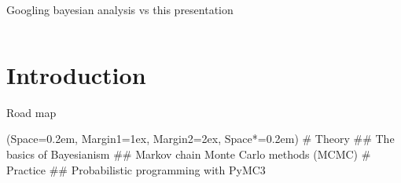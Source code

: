 \documentclass[12pt, aspectratio=149]{beamer}
\newcommand{\listSpace}{0.2em}
\theoremstyle{plain}
\begin{document}
\begin{frame}[fragile]{Googling bayesian analysis vs this presentation}
\begin{columns}
\begin{column}{0.5\linewidth}
	\end{column}
	\end{columns}
\end{frame}


\section{Introduction}
\begin{frame}[fragile]{Road map}
	\begin{easylist}[enumerate]
		\ListProperties(Space=\listSpace, Margin1=1ex, Margin2=2ex, Space*=\listSpace)
		# Theory
		## The basics of Bayesianism
		## Markov chain Monte Carlo methods (MCMC)
		# Practice
		## Probabilistic programming with PyMC3
	\end{easylist}
\end{frame}
\end{document}
